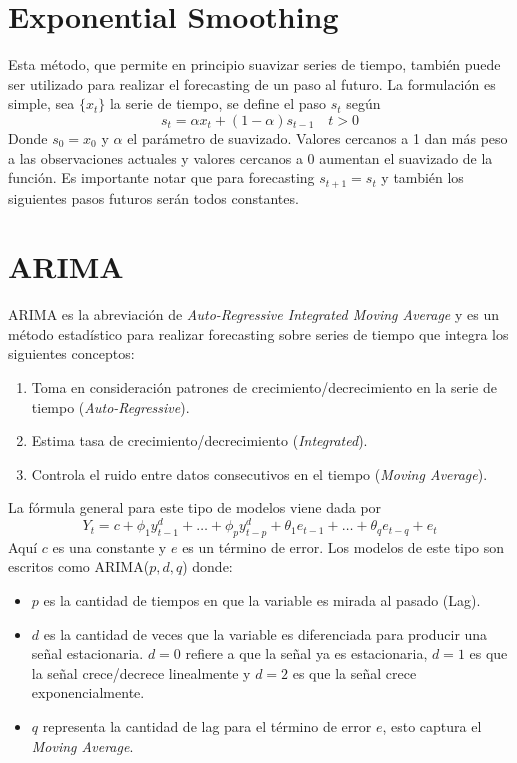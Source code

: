 \section{Exponential Smoothing}

Esta método, que permite en principio suavizar series de tiempo, también puede ser utilizado para realizar el forecasting de un paso al futuro. La formulación es simple, sea $\{x_t\}$ la serie de tiempo, se define el paso $s_t$ según 
$$ 
s_t = \alpha x_t + (1 - \alpha) s_{t-1} \quad t > 0 
$$
Donde $s_0 = x_0$ y $\alpha$ el parámetro de suavizado. Valores cercanos a 1 dan más peso a las observaciones actuales y valores cercanos a 0 aumentan el suavizado de la función. Es importante notar que para forecasting $s_{t+1} = s_{t}$ y también los siguientes pasos futuros serán todos constantes. 



\section{ARIMA}

ARIMA es la abreviación de \textit{Auto-Regressive Integrated Moving Average} y es un método estadístico para realizar forecasting sobre series de tiempo que integra los siguientes conceptos:

\begin{enumerate}
    \item Toma en consideración patrones de crecimiento/decrecimiento en la serie de tiempo (\textit{Auto-Regressive}). 
    \item Estima tasa de crecimiento/decrecimiento (\textit{Integrated}).
    \item Controla el ruido entre datos consecutivos en el tiempo (\textit{Moving Average}).
\end{enumerate}

La fórmula general para este tipo de modelos viene dada por 
$$
Y_t = c + \phi_1y^d_{t-1} + \dots + \phi_py^d_{t-p} + \theta_1e_{t-1} + \dots + \theta_q e_{t-q} + e_t
$$
Aquí $c$ es una constante y $e$ es un término de error. Los modelos de este tipo son escritos como ARIMA($p,d,q$) donde: 

\begin{itemize}
    \item $p$ es la cantidad de tiempos en que la variable es mirada al pasado (Lag).
    \item $d$ es la cantidad de veces que la variable es diferenciada para producir una señal estacionaria. $d=0$ refiere a que la señal ya es estacionaria, $d=1$ es que la señal crece/decrece linealmente y $d=2$ es que la señal crece exponencialmente. 
    \item $q$ representa la cantidad de lag para el término de error $e$, esto captura el \textit{Moving Average}.
\end{itemize}

